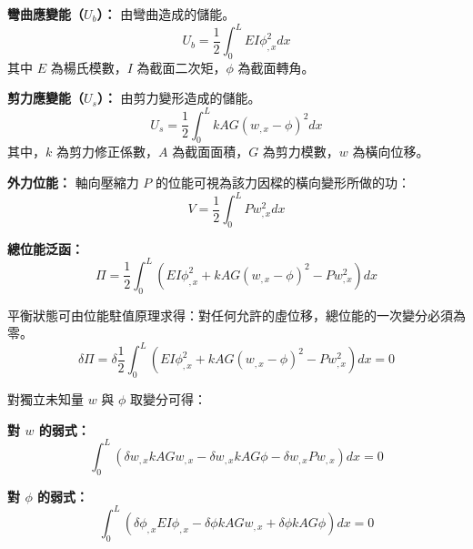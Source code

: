 \documentclass[UTF8, a4paper, 12pt]{ctexart}
\begin{document}
\textbf{彎曲應變能（$U_{b}$）：} 由彎曲造成的儲能。
\begin{equation}
  U_{b} = \frac{1}{2}\int_{0}^{L}EI\phi_{,x}^{2}dx
\end{equation}
其中 $E$ 為楊氏模數，$I$ 為截面二次矩，$\phi$ 為截面轉角。

\textbf{剪力應變能（$U_s$）：} 由剪力變形造成的儲能。
\begin{equation}
  U_{s} = \frac{1}{2}\int_{0}^{L}kAG(w_{,x}-\phi)^{2}dx
\end{equation}
其中，$k$ 為剪力修正係數，$A$ 為截面面積，$G$ 為剪力模數，$w$ 為橫向位移。

\textbf{外力位能：} 軸向壓縮力 $P$ 的位能可視為該力因樑的橫向變形所做的功：
\begin{equation}
  V = \frac{1}{2}\int_{0}^{L}Pw_{,x}^{2}dx
\end{equation}

\textbf{總位能泛函：}
\begin{equation}
  \Pi = \frac{1}{2}\int_{0}^{L}(EI\phi_{,x}^{2}+kAG(w_{,x}-\phi)^{2}-Pw_{,x}^{2})dx
\end{equation}


平衡狀態可由位能駐值原理求得：對任何允許的虛位移，總位能的一次變分必須為零。
\begin{equation}
  \delta\Pi = \delta\frac{1}{2}\int_{0}^{L}(EI\phi_{,x}^{2}+kAG(w_{,x}-\phi)^{2}-Pw_{,x}^{2})dx = 0
\end{equation}

對獨立未知量 $w$ 與 $\phi$ 取變分可得：

\textbf{對 $w$ 的弱式：}
\begin{equation}
  \int_{0}^{L}(\delta w_{,x}kAGw_{,x} - \delta w_{,x}kAG\phi - \delta w_{,x}Pw_{,x})dx = 0
\end{equation}

\textbf{對 $\phi$ 的弱式：}
\begin{equation}
  \int_{0}^{L}(\delta\phi_{,x}EI\phi_{,x} - \delta\phi kAGw_{,x} + \delta\phi kAG\phi)dx = 0
\end{equation}

\end{document}
